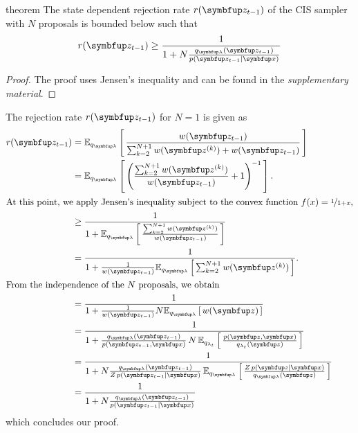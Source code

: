 
\begin{theoremEnd}{theorem}\label{thm:rej_bound}
  The state dependent rejection rate \(r(\vz_{t-1})\) of the CIS sampler with \(N\) proposals is bounded below such that
  \[
  r(\vz_{t-1}) \geq \frac{1}{1 + N\frac{q_{\vlambda}(\vz_{t-1})}{p(\vz_{t-1}\mid\vx)}}
  \]
\end{theoremEnd}
\begin{proof}
  The proof uses Jensen's inequality and can be found in the \textit{supplementary material}.
\end{proof}
\begin{proofEnd}
  The rejection rate \(r(\vz_{t-1})\) for \(N=1\) is given as
  \begin{align}
    r(\vz_{t-1})
    &= \Esub{q_{\vlambda}}{ \frac{w(\vz_{t-1})}{ \sum^{N+1}_{k=2} w(\vz^{(k)}) + w(\vz_{t-1})} } \\
    &= \Esub{q_{\vlambda}}{ {\left( \frac{\sum^{N+1}_{k=2} w(\vz^{(k)}) }{ w(\vz_{t-1}) } + 1 \right)}^{-1} }.  \\
\intertext{At this point, we apply Jensen's inequality subject to the convex function \(f(x) = \nicefrac{1}{1 + x}\),}
    &\geq \frac{1}{1 + \Esub{q_{\vlambda}}{ \frac{\sum^{N+1}_{k=2} w(\vz^{(k)})}{w(\vz_{t-1})} } } \\
    &=    \frac{1}{1 + \frac{1}{w(\vz_{t-1})} \Esub{q_{\vlambda}}{ \sum^{N+1}_{k=2} w(\vz^{(k)}) } }. \\
\intertext{From the independence of the \(N\) proposals, we obtain}
    &=    \frac{1}{1 + \frac{1}{w(\vz_{t-1})} N \Esub{q_{\vlambda}}{ w(\vz) } } \\
    &=    \frac{1}{1 + \frac{q_{\vlambda}(\vz_{t-1})}{p(\vz_{t-1},\vx)}\,N\,\Esub{q_{\lambda_t}}{ \frac{p(\vz, \vx) }{q_{\lambda_t}(\vz)} } } \\
    &=    \frac{1}{1 + N \frac{q_{\vlambda}(\vz_{t-1})}{Z\,p(\vz_{t-1}\mid\vx)}\,\Esub{q_{\vlambda}}{ \frac{Z\,p(\vz\mid\vx) }{q_{\vlambda}(\vz)} } } \\
    &=    \frac{1}{1 + N \frac{q_{\vlambda}(\vz_{t-1})}{p(\vz_{t-1}\mid\vx)} } \\
  \end{align}
  which concludes our proof.
\end{proofEnd}

